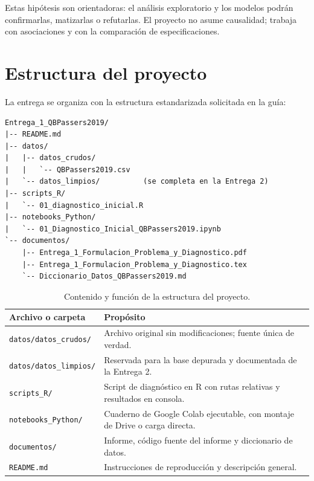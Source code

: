 \documentclass[11pt,a4paper]{article}
\begin{document}
Estas hipótesis son orientadoras: el análisis exploratorio y los modelos podrán confirmarlas, matizarlas o refutarlas. El proyecto no asume causalidad; trabaja con asociaciones y con la comparación de especificaciones.

\section{Estructura del proyecto}
La entrega se organiza con la estructura estandarizada solicitada en la guía:

\begin{verbatim}
Entrega_1_QBPassers2019/
|-- README.md
|-- datos/
|   |-- datos_crudos/
|   |   `-- QBPassers2019.csv
|   `-- datos_limpios/          (se completa en la Entrega 2)
|-- scripts_R/
|   `-- 01_diagnostico_inicial.R
|-- notebooks_Python/
|   `-- 01_Diagnostico_Inicial_QBPassers2019.ipynb
`-- documentos/
    |-- Entrega_1_Formulacion_Problema_y_Diagnostico.pdf
    |-- Entrega_1_Formulacion_Problema_y_Diagnostico.tex
    `-- Diccionario_Datos_QBPassers2019.md
\end{verbatim}

\begin{table}[H]
\centering
\small
\begin{tabularx}{\textwidth}{@{}p{4.3cm}L@{}}
\toprule
\textbf{Archivo o carpeta} & \textbf{Propósito} \\
\midrule
\texttt{datos/datos\_crudos/} & Archivo original sin modificaciones; fuente única de verdad. \\
\texttt{datos/datos\_limpios/} & Reservada para la base depurada y documentada de la Entrega 2. \\
\texttt{scripts\_R/} & Script de diagnóstico en R con rutas relativas y resultados en consola. \\
\texttt{notebooks\_Python/} & Cuaderno de Google Colab ejecutable, con montaje de Drive o carga directa. \\
\texttt{documentos/} & Informe, código fuente del informe y diccionario de datos. \\
\texttt{README.md} & Instrucciones de reproducción y descripción general. \\
\bottomrule
\end{tabularx}
\caption{Contenido y función de la estructura del proyecto.}
\label{tab:estructura}
\end{table}
\end{document}
